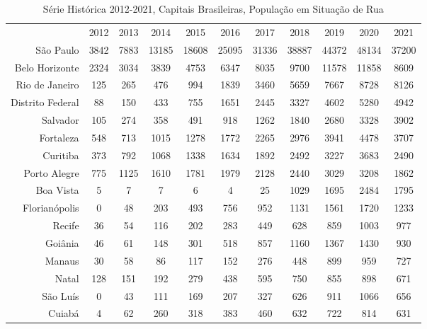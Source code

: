 \documentclass[14pt]{extarticle}
\begin{document}
\begin{table}[htbp]
  \centering
  \caption{Série Histórica 2012-2021, Capitais Brasileiras, População em Situação de Rua}
    \tabcolsep=0.60cm
	\renewcommand{\arraystretch}{2.3}
	\begin{adjustbox}{max width=\linewidth}
    \begin{tabular}{rcccccccccc}
    \hline
    \rowcolor[rgb]{ .651,  .651,  .651} \multicolumn{1}{c}{\textcolor[rgb]{ 1,  1,  1}{Capital}} & 2012 & 2013 & 2014 & 2015 & 2016 & 2017 & 2018 & 2019 & 2020 & 2021 \\
    São Paulo & 3842 & 7883 & 13185 & 18608 & 25095 & 31336 & 38887 & 44372 & 48134 & 37200 \\
    Belo Horizonte & 2324 & 3034 & 3839 & 4753 & 6347 & 8035 & 9700 & 11578 & 11858 & 8609 \\
    Rio de Janeiro & 125  & 265  & 476  & 994  & 1839 & 3460 & 5659 & 7667 & 8728 & 8126 \\
    Distrito Federal & 88   & 150  & 433  & 755  & 1651 & 2445 & 3327 & 4602 & 5280 & 4942 \\
    Salvador & 105  & 274  & 358  & 491  & 918  & 1262 & 1840 & 2680 & 3328 & 3902 \\
    Fortaleza & 548  & 713  & 1015 & 1278 & 1772 & 2265 & 2976 & 3941 & 4478 & 3707 \\
    Curitiba & 373  & 792  & 1068 & 1338 & 1634 & 1892 & 2492 & 3227 & 3683 & 2490 \\
    Porto Alegre & 775  & 1125 & 1610 & 1781 & 1979 & 2128 & 2440 & 3029 & 3208 & 1862 \\
    Boa Vista & 5    & 7    & 7    & 6    & 4    & 25   & 1029 & 1695 & 2484 & 1795 \\
    Florianópolis & 0    & 48   & 203  & 493  & 756  & 952  & 1131 & 1561 & 1720 & 1233 \\
    Recife & 36   & 54   & 116  & 202  & 283  & 449  & 628  & 859  & 1003 & 977 \\
    Goiânia & 46   & 61   & 148  & 301  & 518  & 857  & 1160 & 1367 & 1430 & 930 \\
    Manaus & 30   & 58   & 86   & 117  & 152  & 276  & 448  & 899  & 959  & 727 \\
    Natal & 128  & 151  & 192  & 279  & 438  & 595  & 750  & 855  & 898  & 671 \\
    São Luís & 0    & 43   & 111  & 169  & 207  & 327  & 626  & 911  & 1066 & 656 \\
    Cuiabá & 4    & 62   & 260  & 318  & 383  & 460  & 632  & 722  & 814  & 631 \\

\end{tabular}
\end{adjustbox}
\end{table}
\end{document}
